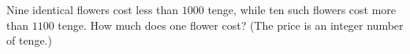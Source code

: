 Nine identical flowers cost less than $1000$ tenge, while ten such flowers cost more than $1100$ tenge. How much does one flower cost? (The price is an integer number of tenge.)
